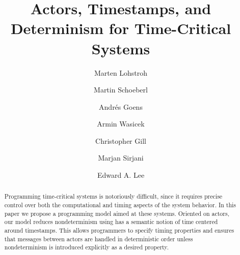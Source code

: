 \documentclass[sigconf]{acmart}
\begin{document}
\title{Actors, Timestamps, and Determinism for Time-Critical Systems}


\author{Marten Lohstroh}


\author{Martin Schoeberl}

\author{Andr\'es Goens}
\orcid{}

\author{Armin Wasicek}
\orcid{}

\author{Christopher Gill}
\orcid{}


\author{Marjan Sirjani}
\orcid{}


\author{Edward A. Lee}



\renewcommand{\shortauthors}{M. Lohstroh et al.}

\begin{abstract}
Programming time-critical systems is notoriously difficult, since it requires precise control over both the computational and timing aspects of the system behavior. In this paper we propose a programming model aimed at these systems. 
Oriented on actors, our model reduces nondeterminism using has a semantic notion of time centered around timestamps.
This allows programmers to specify timing properties and ensures that messages between actors are handled in deterministic order unless nondeterminism is introduced explicitly as a desired property.
\end{abstract}
\end{document}

